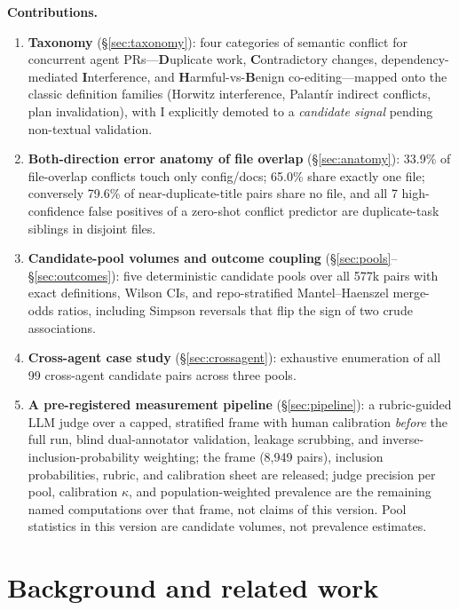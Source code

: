 \documentclass{article}
\begin{document}
\textbf{Contributions.}
\begin{enumerate}
  \item \textbf{Taxonomy} (\S\ref{sec:taxonomy}): four categories of semantic conflict for concurrent agent PRs---\textbf{D}uplicate work, \textbf{C}ontradictory changes, dependency-mediated \textbf{I}nterference, and \textbf{H}armful-vs-\textbf{B}enign co-editing---mapped onto the classic definition families (Horwitz interference, Palant\'ir indirect conflicts, plan invalidation), with I explicitly demoted to a \emph{candidate signal} pending non-textual validation.
  \item \textbf{Both-direction error anatomy of file overlap} (\S\ref{sec:anatomy}): 33.9\% of file-overlap conflicts touch only config/docs; 65.0\% share exactly one file; conversely 79.6\% of near-duplicate-title pairs share no file, and all 7 high-confidence false positives of a zero-shot conflict predictor are duplicate-task siblings in disjoint files. %
  \item \textbf{Candidate-pool volumes and outcome coupling} (\S\ref{sec:pools}--\S\ref{sec:outcomes}): five deterministic candidate pools over all 577k pairs with exact definitions, Wilson CIs, and repo-stratified Mantel--Haenszel merge-odds ratios, including Simpson reversals that flip the sign of two crude associations.
  \item \textbf{Cross-agent case study} (\S\ref{sec:crossagent}): exhaustive enumeration of all 99 cross-agent candidate pairs across three pools.
  \item \textbf{A pre-registered measurement pipeline} (\S\ref{sec:pipeline}): a rubric-guided LLM judge over a capped, stratified frame with human calibration \emph{before} the full run, blind dual-annotator validation, leakage scrubbing, and inverse-inclusion-probability weighting; the frame (8{,}949 pairs), inclusion probabilities, rubric, and calibration sheet are released; judge precision per pool, calibration $\kappa$, and population-weighted prevalence are the remaining named computations over that frame, not claims of this version. %
 Pool statistics in this version are candidate volumes, not prevalence estimates.
\end{enumerate}

\section{Background and related work}
\label{sec:related}
\end{document}
